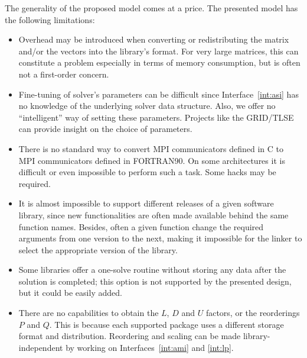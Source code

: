 \documentclass[acmtoms,acmnow]{acmtrans2m}
\begin{document}
The generality of the proposed model comes at a price. The presented model has the following
limitations:
\begin{itemize}
\item
Overhead may be introduced when converting or redistributing the
matrix and/or the vectors into the library's format. For very large
matrices, this can constitute a problem especially in terms of
memory consumption, but is often not a first-order concern.
\item
Fine-tuning of solver's parameters can be
difficult since Interface~\ref{int:asi} has no knowledge of the underlying
solver data structure. Also, we offer no ``intelligent'' way of setting these
parameters.  Projects like the GRID/TLSE~\cite{dayde04overview} can provide
insight on the choice of parameters.

\item There
  is no standard way to
  convert MPI communicators defined in C to MPI communicators defined
  in FORTRAN90. On some architectures it is difficult or even
  impossible to perform such a task. Some hacks may be required.

\item
It is almost impossible to support different releases of a given software
library, since new functionalities are often made available behind the same
function names. Besides, often a given function change the required arguments
from one version to the next, making it impossible for the linker to select
the appropriate version of the library.

%
%
\item
Some libraries offer a one-solve routine without storing any data after the
solution is completed; this option is not  supported
by the presented design, but it could be easily added.

\item
There are no capabilities to obtain the $L$, $D$ and $U$ factors, or the
reorderings $P$ and $Q$. This is because each supported package uses a
different storage format and distribution. Reordering and scaling can be made
library-independent by working on Interfaces~\ref{int:ami} and \ref{int:lp}.


\end{itemize}
\end{document}
